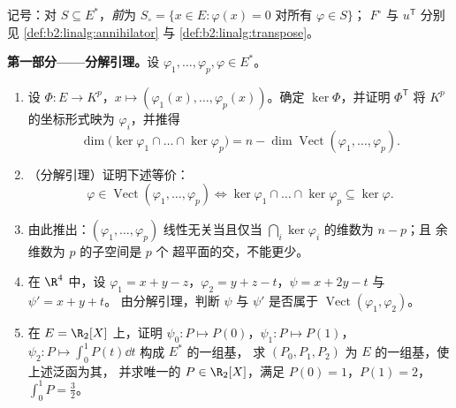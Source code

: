 \begin{problem}
\label{pb:b2:linalg:1}
记号：对 $S \subseteq E^*$，\emph{前}为
$S_\circ = \{x \in E : \varphi(x) = 0 \text{ 对所有 } \varphi
\in S\}$； $F^\circ$ 与 $u^{\mathsf T}$
分别见 \cref{def:b2:linalg:annihilator} 与
\cref{def:b2:linalg:transpose}。

\medskip
\noindent\textbf{第一部分——分解引理。}设
$\varphi_1, \dots, \varphi_p, \varphi \in E^*$。
\begin{enumerate}
  \item 设 $\Phi \colon E \to K^p$，$x \mapsto (\varphi_1(x),
        \dots, \varphi_p(x))$。确定 $\ker\Phi$，并证明
        $\Phi^{\mathsf T}$ 将 $K^p$ 的坐标形式映为
        $\varphi_i$，并推得
        \[
        \dim \bigl(\ker\varphi_1 \cap \dots \cap
        \ker\varphi_p\bigr) = n - \dim
        \operatorname{Vect}(\varphi_1, \dots, \varphi_p).
        \]
  \item （分解引理）证明下述等价：
        \[
        \varphi \in \operatorname{Vect}(\varphi_1, \dots,
        \varphi_p)
        \iff
        \ker\varphi_1 \cap \dots \cap \ker\varphi_p \subseteq
        \ker\varphi .
        \]
  \item 由此推出：$(\varphi_1, \dots, \varphi_p)$ 线性无关当且仅当
        $\bigcap_i \ker\varphi_i$ 的维数为 $n - p$；且
        余维数为 $p$ 的子空间是 $p$ 个
        超平面的交，不能更少。
  \item 在 $\R^4$ 中，设 $\varphi_1 = x + y - z$，$\varphi_2 = y +
        z - t$，$\psi = x + 2y - t$ 与 $\psi' = x + y + t$。
        由分解引理，判断 $\psi$ 与
        $\psi'$ 是否属于 $\operatorname{Vect}(\varphi_1,
        \varphi_2)$。
  \item 在 $E = \R_2[X]$ 上，证明 $\psi_0 \colon P \mapsto
        P(0)$，$\psi_1 \colon P \mapsto P(1)$，$\psi_2 \colon P
        \mapsto \int_0^1 P(t)\dd t$ 构成 $E^*$ 的一组基，
        求 $(P_0, P_1, P_2)$ 为 $E$ 的一组基，使上述泛函为其，
        并求唯一的 $P \in \R_2[X]$，满足 $P(0)
        = 1$，$P(1) = 2$，$\int_0^1 P = \frac32$。
\end{enumerate}


\end{problem}
